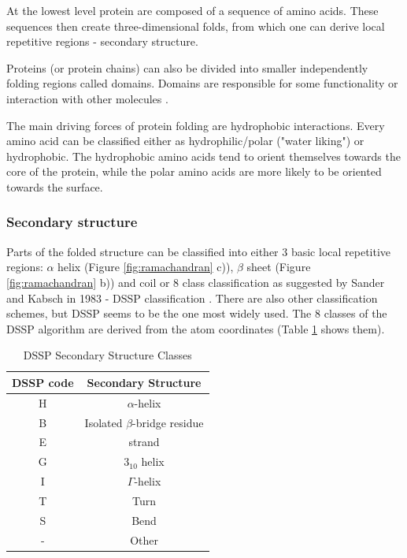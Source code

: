 At the lowest level protein are composed of a sequence of amino acids. 
These sequences then create three-dimensional folds, from which one can derive local repetitive regions - secondary structure. 

Proteins (or protein chains) can also be divided into smaller independently folding regions called domains. 
Domains are responsible for some functionality or interaction with other molecules \cite{domains}.

The main driving forces of protein folding are hydrophobic interactions. 
Every amino acid can be classified either as hydrophilic/polar ("water liking") or hydrophobic. 
The hydrophobic amino acids tend to orient themselves towards the core of the protein, while the polar amino acids are more likely to be oriented towards the surface.

\subsubsection{Secondary structure}

Parts of the folded structure can be classified into either 3 basic local repetitive regions: $\alpha$ helix (Figure \ref{fig:ramachandran} c)), $\beta$ sheet (Figure \ref{fig:ramachandran} b)) and coil or 8 class classification as suggested by Sander and Kabsch in 1983 - DSSP classification \cite{dssp2}. 
There are also other classification schemes, but DSSP seems to be the one most widely used. 
The 8 classes of the DSSP algorithm are derived from the atom coordinates (Table \ref{tab:dssp0} shows them).

\begin{table}[ht]
    \centering
    \begin{tabular}{c|c}
        DSSP code & Secondary Structure\\ 
        \hline
        H     & $\alpha$-helix \\
        B     & Isolated $\beta$-bridge residue \\
        E     & strand \\
        G     & $3_{10}$ helix \\
        I     & $\Gamma$-helix \\
        T     & Turn \\
        S     & Bend \\
        -     & Other 
    \end{tabular}
    \caption{DSSP Secondary Structure Classes}
    \label{tab:dssp0}
\end{table}


